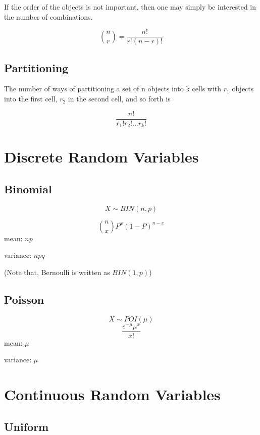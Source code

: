 \documentclass[]{book}
\begin{document}
If the order of the objects is not important, then one may simply be interested in the number of combinations.

\[\binom{n}{r}=\frac{n!}{r!(n-r)!}\]

\hypertarget{partitioning}{%
\subsection{Partitioning}\label{partitioning}}

The number of ways of partitioning a set of n objects into k cells with \(r_1\) objects into the first cell, \(r_2\) in the second cell, and so forth is

\[\frac{n!}{r_1! r_2! ...r_k!}\]

\hypertarget{discrete-random-variables}{%
\section{Discrete Random Variables}\label{discrete-random-variables}}

\hypertarget{binomial}{%
\subsection{Binomial}\label{binomial}}

\[X\sim BIN(n,p)\]

\[\binom{n}{x}P^x(1-P)^{n-x}\]
mean: \(np\)

variance: \(npq\)

(Note that, Bernoulli is written as \(BIN(1, p)\))

\hypertarget{poisson}{%
\subsection{Poisson}\label{poisson}}

\[X \sim POI(\mu)\]
\[\frac{e^{-\mu}\mu^x}{x!}\]
mean: \(\mu\)

variance: \(\mu\)

\hypertarget{continuous-random-variables}{%
\section{Continuous Random Variables}\label{continuous-random-variables}}

\hypertarget{uniform}{%
\subsection{Uniform}\label{uniform}}
\end{document}
